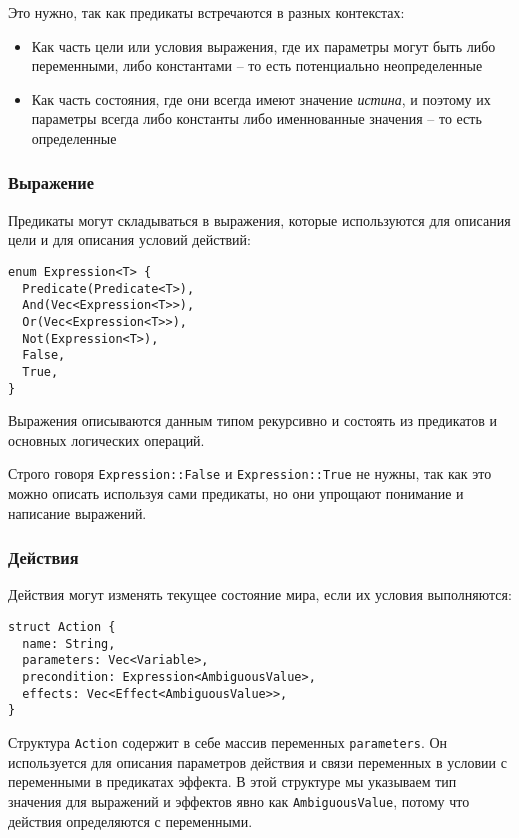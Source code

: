 \documentclass{article}
\begin{document}
Это нужно, так как предикаты встречаются в разных контекстах:

\begin{itemize}
  \item Как часть цели или условия выражения, где их параметры могут быть либо переменными, либо константами -- то есть потенциально неопределенные
  \item Как часть состояния, где они всегда имеют значение \textit{истина},
    и поэтому их параметры всегда либо константы либо именнованные значения -- то есть определенные
\end{itemize}

\subsubsection{Выражение}

Предикаты могут складываться в выражения, которые используются для описания цели
и для описания условий действий:

\begin{verbatim}
enum Expression<T> {
  Predicate(Predicate<T>),
  And(Vec<Expression<T>>),
  Or(Vec<Expression<T>>),
  Not(Expression<T>),
  False,
  True,
}
\end{verbatim}

Выражения описываются данным типом рекурсивно
и состоять из предикатов и основных логических операций.

Строго говоря \texttt{Expression::False} и \texttt{Expression::True}
не нужны, так как это можно описать используя сами предикаты,
но они упрощают понимание и написание выражений.

\subsubsection{Действия}

Действия могут изменять текущее состояние мира, если их условия выполняются:

\begin{verbatim}
struct Action {
  name: String,
  parameters: Vec<Variable>,
  precondition: Expression<AmbiguousValue>,
  effects: Vec<Effect<AmbiguousValue>>,
}
\end{verbatim}

Структура \texttt{Action} содержит в себе массив переменных \texttt{parameters}.
Он используется для описания параметров действия и связи переменных в условии
с переменными в предикатах эффекта.
В этой структуре мы указываем тип значения для выражений и эффектов явно как \texttt{AmbiguousValue},
потому что действия определяются с переменными.
\end{document}
